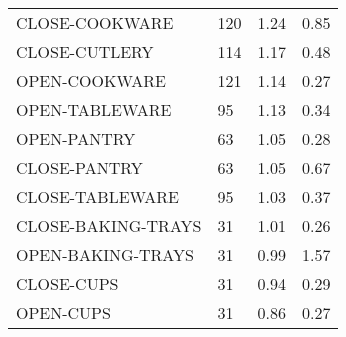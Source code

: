 {\begin{xltabular}{\textwidth}{X X X X}
CLOSE-COOKWARE       & 120   & 1.24   & 0.85   \\
CLOSE-CUTLERY        & 114   & 1.17   & 0.48   \\
OPEN-COOKWARE        & 121   & 1.14   & 0.27   \\
OPEN-TABLEWARE       & 95    & 1.13   & 0.34   \\
OPEN-PANTRY          & 63    & 1.05   & 0.28   \\
CLOSE-PANTRY         & 63    & 1.05   & 0.67   \\
CLOSE-TABLEWARE      & 95    & 1.03   & 0.37   \\
CLOSE-BAKING-TRAYS   & 31    & 1.01   & 0.26   \\
OPEN-BAKING-TRAYS    & 31    & 0.99   & 1.57   \\
CLOSE-CUPS           & 31    & 0.94   & 0.29   \\
OPEN-CUPS            & 31    & 0.86   & 0.27   \\
    \hline
\end{xltabular}
}